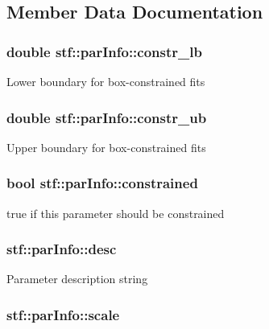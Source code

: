 \subsection{Member Data Documentation}
\hypertarget{structstf_1_1parInfo_a78f17a10d539858d71539135ee4e46ce}{
\subsubsection[{constr\_\-lb}]{\setlength{\rightskip}{0pt plus 5cm}double {\bf stf::parInfo::constr\_\-lb}}}
\label{structstf_1_1parInfo_a78f17a10d539858d71539135ee4e46ce}
Lower boundary for box-\/constrained fits \hypertarget{structstf_1_1parInfo_a0cd313970fe68a4dc1ede892029f545a}{
\subsubsection[{constr\_\-ub}]{\setlength{\rightskip}{0pt plus 5cm}double {\bf stf::parInfo::constr\_\-ub}}}
\label{structstf_1_1parInfo_a0cd313970fe68a4dc1ede892029f545a}
Upper boundary for box-\/constrained fits \hypertarget{structstf_1_1parInfo_acd5ad5c8721d2d0275932671c81bac1a}{
\subsubsection[{constrained}]{\setlength{\rightskip}{0pt plus 5cm}bool {\bf stf::parInfo::constrained}}}
\label{structstf_1_1parInfo_acd5ad5c8721d2d0275932671c81bac1a}
true if this parameter should be constrained \hypertarget{structstf_1_1parInfo_a9fd83d6be04108ad0947ff0e336bb4c4}{
\subsubsection[{desc}]{ {\bf stf::parInfo::desc}}}
\label{structstf_1_1parInfo_a9fd83d6be04108ad0947ff0e336bb4c4}
Parameter description string \hypertarget{structstf_1_1parInfo_abfcd4e222d78f17e915b587457c98a37}{
\subsubsection[{scale}]{ {\bf stf::parInfo::scale}}}
